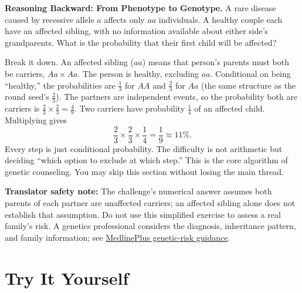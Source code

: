 \begin{tiaozhan}
\textbf{Reasoning Backward: From Phenotype to Genotype.} A rare disease caused by recessive allele $a$ affects only $aa$ individuals. A healthy couple each have an affected sibling, with no information available about either side's grandparents. What is the probability that their first child will be affected?

Break it down. An affected sibling ($aa$) means that person's parents must both be carriers, $Aa \times Aa$. The person is healthy, excluding $aa$. Conditional on being ``healthy,'' the probabilities are $\frac{1}{3}$ for $AA$ and $\frac{2}{3}$ for $Aa$ (the same structure as the round seed's $\frac{2}{3}$). The partners are independent events, so the probability both are carriers is $\frac{2}{3}\times\frac{2}{3}=\frac{4}{9}$. Two carriers have probability $\frac{1}{4}$ of an affected child. Multiplying gives
\[
\frac{2}{3}\times\frac{2}{3}\times\frac{1}{4}=\frac{1}{9}\approx 11\%.
\]
Every step is just conditional probability. The difficulty is not arithmetic but deciding ``which option to exclude at which step.'' This is the core algorithm of genetic counseling. You may skip this section without losing the main thread.
\end{tiaozhan}

\textbf{Translator safety note:} The challenge's numerical answer assumes both parents of each partner are unaffected carriers; an affected sibling alone does not establish that assumption. Do not use this simplified exercise to assess a real family's risk. A genetics professional considers the diagnosis, inheritance pattern, and family information; see \href{https://medlineplus.gov/genetics/understanding/inheritance/riskassessment/}{MedlinePlus genetic-risk guidance}.

\section*{Try It Yourself}

